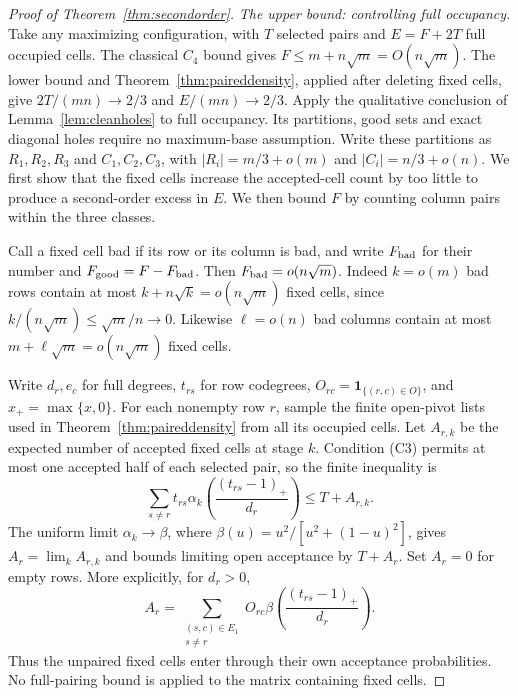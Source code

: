 \documentclass[11pt]{article}
\begin{document}
\begin{proof}[Proof of Theorem~\ref{thm:secondorder}]
\smallskip
\noindent\emph{The upper bound: controlling full occupancy.}
Take any maximizing configuration, with $T$ selected
pairs and $E=F+2T$ full occupied cells. The classical $C_4$ bound gives
$F\le m+n\sqrt m=O(n\sqrt m)$. The lower bound and
Theorem~\ref{thm:paireddensity}, applied after deleting fixed cells,
give $2T/(mn)\to2/3$ and $E/(mn)\to2/3$.
Apply the qualitative conclusion of Lemma~\ref{lem:cleanholes} to full
occupancy. Its partitions, good sets and exact diagonal holes require
no maximum-base assumption. Write these partitions as $R_1,R_2,R_3$
and $C_1,C_2,C_3$, with $|R_i|=m/3+o(m)$ and
$|C_i|=n/3+o(n)$. We first show that the fixed cells increase the
accepted-cell count by too little to produce a second-order excess in
$E$. We then bound $F$ by counting column pairs within the three classes.

Call a fixed cell bad if its row or its column is bad, and write
$F_{\rm bad}$ for their number and $F_{\rm good}=F-F_{\rm bad}$.
Then $F_{\rm bad}=o(n\sqrt m)$. Indeed $k=o(m)$ bad
rows contain at most $k+n\sqrt k=o(n\sqrt m)$ fixed cells, since
$k/(n\sqrt m)\le\sqrt m/n\to0$. Likewise $\ell=o(n)$ bad columns
contain at most $m+\ell\sqrt m=o(n\sqrt m)$ fixed cells.

Write $d_r,e_c$ for full degrees, $t_{rs}$ for row codegrees,
$O_{rc}=\mathbf1_{\{(r,c)\in O\}}$, and $x_+=\max\{x,0\}$.
For each nonempty row $r$, sample the finite open-pivot lists used in
Theorem~\ref{thm:paireddensity} from all its occupied cells. Let
$A_{r,k}$ be the expected number of accepted fixed cells at stage $k$.
Condition \textup{(C3)} permits at most one accepted half of each
selected pair, so the
finite inequality is
\[
 \sum_{s\ne r}t_{rs}
   \alpha_k\!\left(\frac{(t_{rs}-1)_+}{d_r}\right)
 \le T+A_{r,k}.
\]
The uniform limit $\alpha_k\to\beta$, where
$\beta(u)=u^2/[u^2+(1-u)^2]$, gives $A_r=\lim_k A_{r,k}$ and
bounds limiting open acceptance by $T+A_r$. Set $A_r=0$ for empty
rows. More explicitly, for $d_r>0$,
\[
 A_r=\sum_{\substack{(s,c)\in E_1\\s\ne r}}
 O_{rc}\beta\!\left(\frac{(t_{rs}-1)_+}{d_r}\right).
\]
Thus the unpaired fixed cells enter through their own acceptance
probabilities. No full-pairing bound is applied to the matrix containing
fixed cells.


\end{proof}
\end{document}
